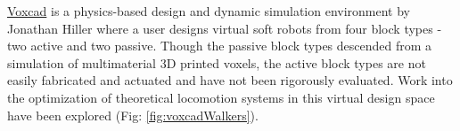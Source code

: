 {\href{http://www.voxcad.com/}{Voxcad} is a physics-based design and dynamic simulation environment by Jonathan Hiller where a user designs virtual soft robots from four block types - two active and two passive\cite{Hiller2014a}.  Though the passive block types descended from a simulation of multimaterial 3D printed voxels, the active block types are not easily fabricated and actuated\cite{Hiller2012} and have not been rigorously evaluated.  Work into the optimization of theoretical locomotion systems in this virtual design space have been explored (Fig: \ref{fig:voxcadWalkers})\cite{Cheney2013b}\cite{Cheney2013}\cite{Cheney2015}.

}
